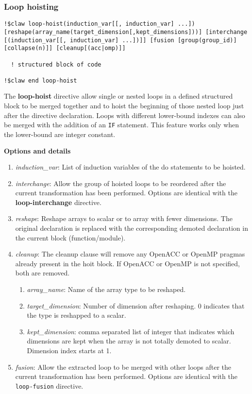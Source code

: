 \subsubsection{Loop hoisting}
\begin{lstlisting}
!$claw loop-hoist(induction_var[[, induction_var] ...]) [reshape(array_name(target_dimension[,kept_dimensions]))] [interchange [(induction_var[[, induction_var] ...])]] [fusion [group(group_id)] [collapse(n)]] [cleanup[(acc|omp)]]

  ! structured block of code

!$claw end loop-hoist
\end{lstlisting}

The \textbf{loop-hoist} directive allow single or nested loops in a defined
structured block to be merged together and to hoist the beginning of those
nested loop just after the directive declaration. Loops with different
lower-bound indexes can also be merged with the addition of an \lstinline!IF!
statement. This feature works only when the lower-bound are integer constant.


\textbf{Options and details}
\begin{enumerate}
\item \textit{induction\_var}: List of induction variables of the do statements
to be hoisted.
\item \textit{interchange}: Allow the group of hoisted loops to be reordered
after the current transformation has been performed.
Options are identical with the \textbf{loop-interchange} directive.
\item \textit{reshape}: Reshape arrays to scalar or to array with fewer
dimensions. The original declaration is replaced with the corresponding demoted
declaration in the current block (function/module).
\item \textit{cleanup}: The cleanup clause will remove any OpenACC or OpenMP pragmas
already present in the hoit block. If OpenACC or OpenMP is not specified, both are
removed.

\begin{enumerate}
  \item \textit{array\_name}: Name of the array type to be reshaped.
  \item \textit{target\_dimension}: Number of dimension after reshaping. 0
  indicates that the type is reshapped to a scalar.
  \item \textit{kept\_dimension}: comma separated list of integer that indicates
  which dimensions are kept when the array is not totally demoted to scalar.
  Dimension index starts at 1.
\end{enumerate}
\item \textit{fusion}: Allow the extracted loop to be merged with other loops
after the current transformation has been performed.
Options are identical with the \lstinline!loop-fusion! directive.
\end{enumerate}


